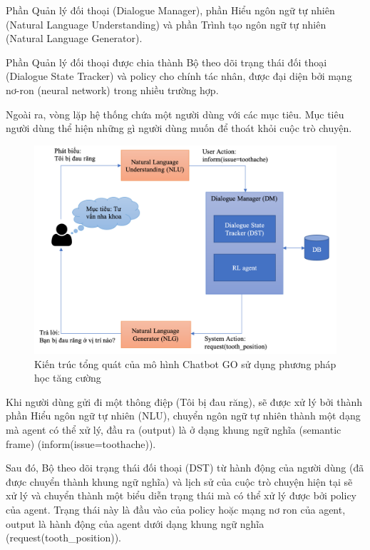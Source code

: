 Phần Quản lý đối thoại (Dialogue Manager),
phần Hiểu ngôn ngữ tự nhiên (Natural Language Understanding) và
phần Trình tạo ngôn ngữ tự nhiên (Natural Language Generator).

Phần Quản lý đối thoại được chia thành Bộ theo dõi trạng thái
đối thoại (Dialogue State Tracker) và policy cho chính tác nhân,
được đại diện bởi mạng nơ-ron (neural network) trong nhiều trường hợp.

Ngoài ra, vòng lặp hệ thống chứa một người dùng với các mục tiêu.
Mục tiêu người dùng thể hiện những gì người dùng muốn để
thoát khỏi cuộc trò chuyện.

\begin{figure}[ht]
    \centering
    \includegraphics[width=1\textwidth]{thesis/chatbot-outline/kienthucnentang/chatbot.png}
    \caption{Kiến trúc tổng quát của mô hình Chatbot GO
    sử dụng phương pháp học tăng cường}
    \label{fig:chatbot}
\end{figure}

Khi người dùng gửi đi một thông điệp (Tôi bị đau răng), sẽ được xử lý
bởi thành phần Hiểu ngôn ngữ tự nhiên (NLU), chuyển ngôn ngữ tự nhiên
thành một dạng mà agent có thể xử lý, đầu ra (output) là ở dạng khung
ngữ nghĩa (semantic frame) (inform(issue=toothache)).

Sau đó, Bộ theo dõi trạng thái đối thoại (DST) từ hành động của
người dùng (đã được chuyển thành khung ngữ nghĩa) và lịch sử của
cuộc trò chuyện hiện tại sẽ xử lý và chuyển thành một biểu diễn
trạng thái mà có thể xử lý được bởi policy của agent. Trạng thái
này là đầu vào của policy hoặc mạng nơ ron của agent, output là
hành động của agent dưới dạng khung ngữ nghĩa (request(tooth\_position)).

